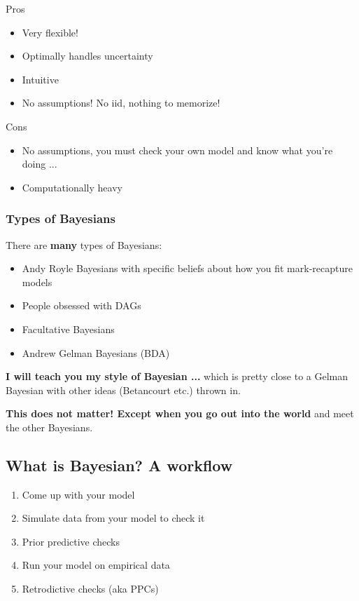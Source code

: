 \documentclass[11pt]{article}
\begin{document}

Pros
\begin{itemize}
\item Very flexible!
\item Optimally handles uncertainty
\item Intuitive
\item No assumptions! No iid, nothing to memorize!
\end{itemize}

Cons
\begin{itemize}
\item No assumptions, you must check your own model and know what you're doing ... 
\item Computationally heavy
\end{itemize}

\subsubsection{Types of Bayesians}
There are {\bf many} types of Bayesians:
\begin{itemize}
\item Andy Royle Bayesians with specific beliefs about how you fit mark-recapture models
\item People obsessed with DAGs
\item Facultative Bayesians
\item Andrew Gelman Bayesians (BDA)
\end{itemize}

{\bf I will teach you my style of Bayesian ...} which is pretty close to a Gelman Bayesian with other ideas (Betancourt etc.) thrown in. 

{\bf This does not matter! Except when you go out into the world} and meet the other Bayesians.

\subsection{What is Bayesian? A workflow}

\begin{enumerate}
\item Come up with your model
\item Simulate data from your model to check it
\item Prior predictive checks
\item Run your model on empirical data
\item Retrodictive checks (aka PPCs)
\end{enumerate}
\end{document}
